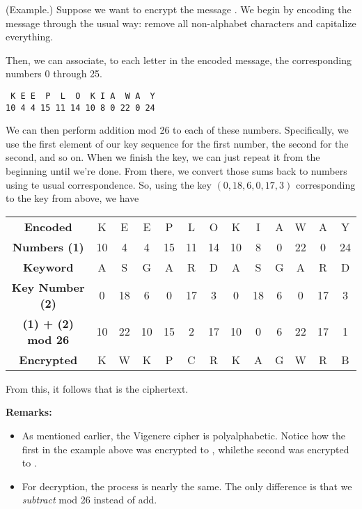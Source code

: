 \documentclass[letterpaper]{article}
\begin{document}
\begin{mdframed}
    (Example.) Suppose we want to encrypt the message . We begin by encoding the message through the usual way: remove all non-alphabet characters and capitalize everything. 
    \begin{mdframed}
    \end{mdframed}
    Then, we can associate, to each letter in the encoded message, the corresponding numbers 0 through 25.
    \begin{mdframed}
\begin{verbatim}
 K E E  P  L  O  K I A  W A  Y
10 4 4 15 11 14 10 8 0 22 0 24\end{verbatim}
    \end{mdframed}
    We can then perform addition mod 26 to each of these numbers. Specifically, we use the first element of our key sequence for the first number, the second for the second, and so on. When we finish the key, we can just repeat it from the beginning until we're done. From there, we convert those sums back to numbers using te usual correspondence. So, using the key $(0, 18, 6, 0, 17, 3)$ corresponding to the key  from above, we have 
    \begin{center}
        \begin{tabular}{c|c c c c c c c c c c c c}
            \textbf{Encoded} & K & E & E & P & L & O & K & I & A & W & A & Y \\ 
            \textbf{Numbers (1)} & 10 & 4 & 4 & 15 & 11 & 14 & 10 & 8 & 0 & 22 & 0 & 24 \\ 
            \textbf{Keyword} & A & S & G & A & R & D & A & S & G & A & R & D \\ 
            \textbf{Key Number (2)} & 0 & 18 & 6 & 0 & 17 & 3 & 0 & 18 & 6 & 0 & 17 & 3 \\ 
            \textbf{(1) + (2) mod 26} & 10 & 22 & 10 & 15 & 2 & 17 & 10 & 0 & 6 & 22 & 17 & 1 \\ 
            \textbf{Encrypted} & K & W & K & P & C & R & K & A & G & W & R & B
        \end{tabular}
    \end{center}
    From this, it follows that  is the ciphertext.
\end{mdframed}
\textbf{Remarks:}
\begin{itemize}
    \item As mentioned earlier, the Vigenere cipher is polyalphabetic. Notice how the first  in the example above was encrypted to , whilethe second  was encrypted to . 
    \item For decryption, the process is nearly the same. The only difference is that we \emph{subtract} mod 26 instead of add. 
\end{itemize} 
\end{document}
